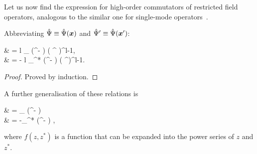 Let us now find the expression for high-order commutators of restricted field operators, analogous to the similar one for single-mode operators~\cite{Louisell1990}.

\begin{lemma}
	Abbreviating $\hat{\Psi} \equiv \hat{\Psi}(\boldsymbol{x})$ and $\hat{\Psi}^\prime \equiv \hat{\Psi}(\boldsymbol{x}^\prime)$:
	\begin{eqn*}
		& = l \delta_{\restbasis} (\xvec^\prime - \xvec) ( \Psiop^{\prime\dagger} )^{l-1}, \\
		& = - l \delta_{\restbasis}^* (\xvec^\prime - \xvec) ( \Psiop^\prime )^{l-1}.
	\end{eqn*}
\end{lemma}
\begin{proof}
Proved by induction.
\end{proof}

A further generalisation of these relations is

\begin{lemma}
\label{lmm:func-operators:functional-commutators}
	\begin{eqn*}
		& = \delta_{\restbasis} (\xvec^\prime - \xvec) \frac{\partial f}{\partial \Psiop^{\prime\dagger}} \\
		& = -\delta_{\restbasis}^* (\xvec^\prime - \xvec) \frac{\partial f}{\partial \Psiop^\prime},
	\end{eqn*}
	where $f(z, z^*)$ is a function that can be expanded into the power series of $z$ and $z^*$.
\end{lemma}
